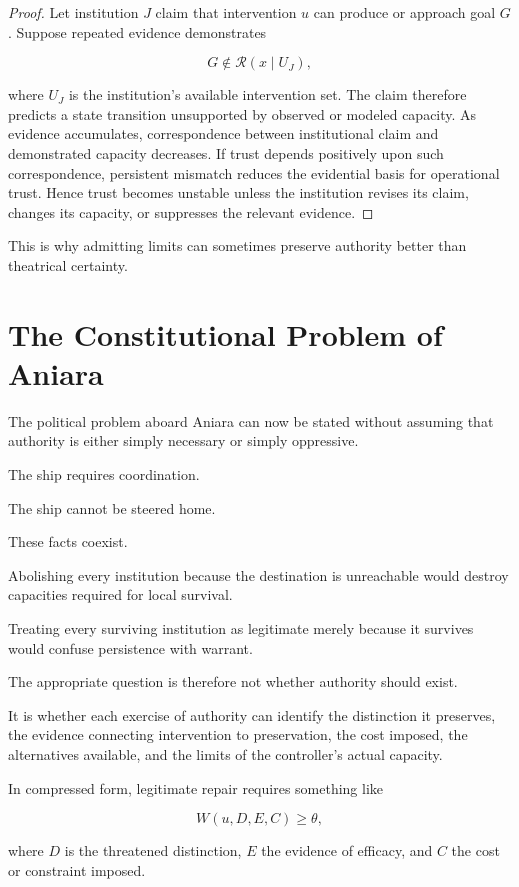 \documentclass[11pt,oneside]{book}
\theoremstyle{definition}
\theoremstyle{remark}
\newcommand{\R}{\mathcal{R}}
\begin{document}
\begin{proof}
Let institution \(J\) claim that intervention \(u\) can produce or approach goal \(G\). Suppose repeated evidence demonstrates

\[
G\notin\R(x\mid U_J),
\]

where \(U_J\) is the institution's available intervention set. The claim therefore predicts a state transition unsupported by observed or modeled capacity. As evidence accumulates, correspondence between institutional claim and demonstrated capacity decreases. If trust depends positively upon such correspondence, persistent mismatch reduces the evidential basis for operational trust. Hence trust becomes unstable unless the institution revises its claim, changes its capacity, or suppresses the relevant evidence.
\end{proof}

This is why admitting limits can sometimes preserve authority better than theatrical certainty.

\section{The Constitutional Problem of Aniara}

The political problem aboard Aniara can now be stated without assuming that authority is either simply necessary or simply oppressive.

The ship requires coordination.

The ship cannot be steered home.

These facts coexist.

Abolishing every institution because the destination is unreachable would destroy capacities required for local survival.

Treating every surviving institution as legitimate merely because it survives would confuse persistence with warrant.

The appropriate question is therefore not whether authority should exist.

It is whether each exercise of authority can identify the distinction it preserves, the evidence connecting intervention to preservation, the cost imposed, the alternatives available, and the limits of the controller's actual capacity.

In compressed form, legitimate repair requires something like

\[
W(u,D,E,C)\geq\theta,
\]

where \(D\) is the threatened distinction, \(E\) the evidence of efficacy, and \(C\) the cost or constraint imposed.
\end{document}
